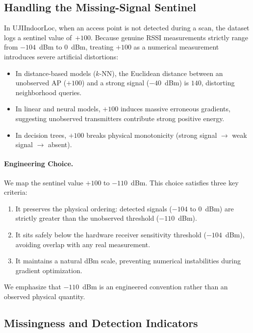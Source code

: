 \subsection{Handling the Missing-Signal Sentinel}

In UJIIndoorLoc, when an access point is not detected during a scan, the dataset logs a sentinel value of~$+100$.
Because genuine RSSI measurements strictly range from $-104$~dBm to $0$~dBm, treating $+100$ as a numerical
measurement introduces severe artificial distortions:
\begin{itemize}
  \item In distance-based models ($k$-NN), the Euclidean distance between an unobserved AP ($+100$) and a strong
        signal ($-40$~dBm) is $140$, distorting neighborhood queries.
  \item In linear and neural models, $+100$ induces massive erroneous gradients, suggesting unobserved transmitters
        contribute strong positive energy.
  \item In decision trees, $+100$ breaks physical monotonicity (strong signal $\to$ weak signal $\to$ absent).
\end{itemize}

\paragraph{Engineering Choice.}
We map the sentinel value $+100$ to $-110$~dBm. This choice satisfies three key criteria:
\begin{enumerate}
  \item It preserves the physical ordering: detected signals ($-104$ to $0$~dBm) are strictly greater than
        the unobserved threshold ($-110$~dBm).
  \item It sits safely below the hardware receiver sensitivity threshold ($-104$~dBm), avoiding overlap
        with any real measurement.
  \item It maintains a natural dBm scale, preventing numerical instabilities during gradient optimization.
\end{enumerate}
We emphasize that $-110$~dBm is an engineered convention rather than an observed physical quantity.

\subsection{Missingness and Detection Indicators}

